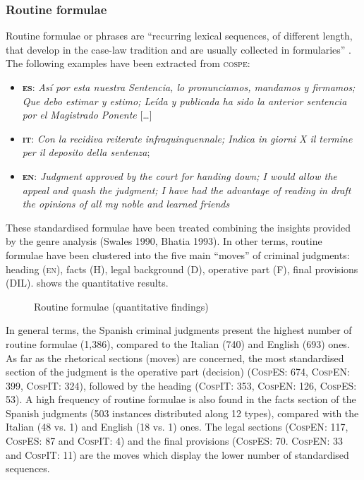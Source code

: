 \documentclass[output=paper]{LSP/langsci}
\begin{document}
\subsubsection{Routine formulae}
Routine formulae or phrases are “recurring lexical sequences, of different length, that develop in the case-law tradition and are usually collected in formularies” \citep[28--29]{Kjær1990}. The following examples have been extracted from \textsc{cospe}:

\newpage
\begin{itemize}
\item \textbf{\textsc{es}}: \textit{Así por esta nuestra Sentencia, lo pronunciamos, mandamos y firmamos; Que debo estimar y estimo; Leída y publicada ha sido la anterior sentencia por el Magistrado Ponente} […]
\item \textbf{\textsc{it}}: \textit{Con la recidiva reiterate infraquinquennale; Indica in giorni X il termine per il deposito della sentenza};
\item \textbf{\textsc{en}}: \textit{Judgment approved by the court for handing down; I would allow the appeal and quash the judgment; I have had the advantage of reading in draft the opinions of all my noble and learned friends}
\end{itemize}

These standardised formulae have been treated combining the insights provided by the genre analysis (Swales 1990, Bhatia 1993). In other terms, routine formulae have been clustered into the five main “moves” of criminal judgments: heading (\textsc{en}), facts (H), legal background (D), operative part (F), final provisions (DIL).  shows the quantitative results.

\begin{figure}

\caption{Routine formulae (quantitative findings)} \label{fig:6:4}
\end{figure}

In general terms, the Spanish criminal judgments present the highest number of routine formulae (1,386), compared to the Italian (740) and English (693) ones. As far as the rhetorical sections (moves) are concerned, the most standardised section of the judgment is the operative part (decision) (\textsc{CospES}: 674, \textsc{CospEN}: 399, \textsc{\textsc{CospIT}}: 324), followed by the heading (\textsc{\textsc{CospIT}}: 353, \textsc{CospEN}: 126, \textsc{CospES}: 53). A high frequency of routine formulae is also found in the facts section of the Spanish judgments (503 instances distributed along 12 types), compared with the Italian (48 vs. 1) and English (18 vs. 1) ones. The legal sections (\textsc{CospEN}: 117, \textsc{CospES}: 87 and \textsc{\textsc{CospIT}}: 4) and the final provisions (\textsc{CospES}: 70. \textsc{CospEN}: 33 and \textsc{\textsc{CospIT}}: 11) are the moves which display the lower number of standardised sequences.
\end{document}
